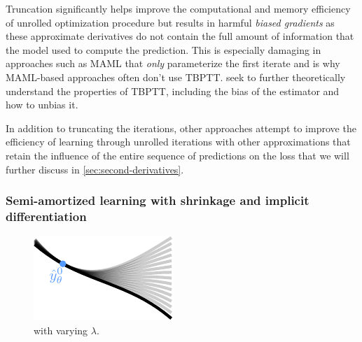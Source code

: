 \documentclass[twoside,11pt]{article}
\begin{document}
Truncation significantly helps improve the computational
and memory efficiency of unrolled optimization procedure
but results in harmful \emph{biased gradients} as
these approximate derivatives do not contain
the full amount of information that the model used
to compute the prediction.
This is especially damaging in approaches
such as MAML \citep{finn2017model} that \emph{only}
parameterize the first iterate and is why MAML-based
approaches often don't use TBPTT.
\citet{tallec2017unbiasing,wu2018understanding,liao2018reviving,shaban2019truncated,vicol2021unbiased}
seek to further theoretically understand the properties
of TBPTT, including the bias of the estimator
and how to unbias it.

In addition to truncating the iterations, other approaches
attempt to improve the efficiency of learning through
unrolled iterations with other approximations
that retain the influence of the entire sequence
of predictions on the loss
\citep{finn2017model,nichol2018first,lorraine2020optimizing}
that we will further discuss in
\cref{sec:second-derivatives}.

\subsubsection{Semi-amortized learning with shrinkage and implicit differentiation}
\begin{figure}
\vspace{-5mm}
\includegraphics[width=\linewidth]{fig/imaml.pdf}
\caption{ with varying $\lambda$.}
\label{fig:imaml}
\vspace{-5mm}
\end{figure}
\end{document}
